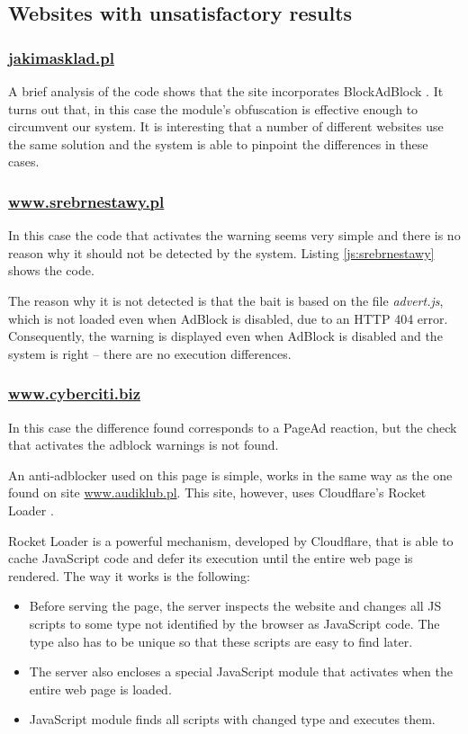 \subsection{Websites with unsatisfactory results}

\subsubsection{\url{jakimasklad.pl}}
A brief analysis of the code shows that the site incorporates BlockAdBlock \cite{github:blockadblock}. 
It turns out that, in this case the module's obfuscation is effective enough to circumvent our system.
It is interesting that a number of different websites use the same solution and the system
is able to pinpoint the differences in these cases.

\subsubsection{\url{www.srebrnestawy.pl}}
In this case the code that activates the warning seems very simple and there is no reason why
it should not be detected by the system. Listing \ref{js:srebrnestawy} shows the code.



The reason why it is not detected is that the bait is based on the file \emph{advert.js}, which is not loaded 
even when AdBlock is disabled, due to an HTTP 404 error. Consequently, the warning is displayed even 
when AdBlock is disabled and the system is right -- there are no execution differences.

\subsubsection{\url{www.cyberciti.biz}}
In this case the difference found corresponds to a PageAd reaction,
but the check that activates the adblock warnings is not found.

An anti-adblocker used on this page is simple, works in the same way as the one found on site \url{www.audiklub.pl}.
This site, however, uses Cloudflare's Rocket Loader \cite{cloud-flare:rocket-loader}.

Rocket Loader is a powerful mechanism, developed by Cloudflare, that is able to cache JavaScript code and defer its execution 
until the entire web page is rendered. The way it works is the following: 
\begin{itemize}
  \item  Before serving the page, the server inspects the website and changes all JS scripts 
            to some type not identified by the browser as JavaScript code.
            The type also has to be unique so that these scripts are easy to find later.
  \item The server also encloses a special JavaScript module that activates when the entire web page is loaded.
  \item JavaScript module finds all scripts with changed type and executes them.
\end{itemize}

